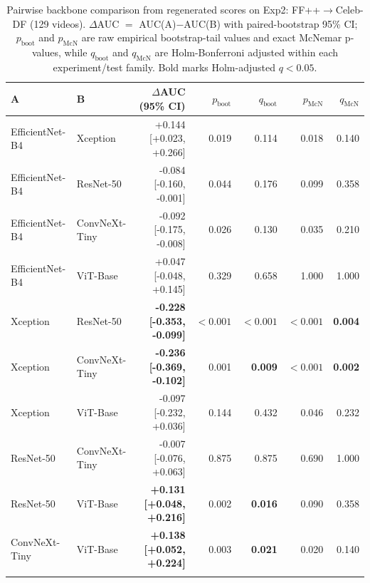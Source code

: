 \begin{table}[!htbp]
\caption{Pairwise backbone comparison from regenerated scores on Exp2: FF++$\to$Celeb-DF (129 videos). $\Delta$AUC $=$ AUC(A)$-$AUC(B) with paired-bootstrap 95\% CI; $p_{\mathrm{boot}}$ and $p_{\mathrm{McN}}$ are raw empirical bootstrap-tail values and exact McNemar p-values, while $q_{\mathrm{boot}}$ and $q_{\mathrm{McN}}$ are Holm-Bonferroni adjusted within each experiment/test family. Bold marks Holm-adjusted $q<0.05$.}
\centering
\small
\setlength{\tabcolsep}{3pt}
\begin{tabular}{l l r r r r r}
\toprule
\textbf{A} & \textbf{B} & \textbf{$\Delta$AUC (95\% CI)} & \textbf{$p_{\mathrm{boot}}$} & \textbf{$q_{\mathrm{boot}}$} & \textbf{$p_{\mathrm{McN}}$} & \textbf{$q_{\mathrm{McN}}$} \\
\midrule
EfficientNet-B4 & Xception & +0.144 [+0.023, +0.266] & 0.019 & 0.114 & 0.018 & 0.140 \\
EfficientNet-B4 & ResNet-50 & -0.084 [-0.160, -0.001] & 0.044 & 0.176 & 0.099 & 0.358 \\
EfficientNet-B4 & ConvNeXt-Tiny & -0.092 [-0.175, -0.008] & 0.026 & 0.130 & 0.035 & 0.210 \\
EfficientNet-B4 & ViT-Base & +0.047 [-0.048, +0.145] & 0.329 & 0.658 & 1.000 & 1.000 \\
Xception & ResNet-50 & \textbf{-0.228 [-0.353, -0.099]} & $<0.001$ & \textbf{$<0.001$} & $<0.001$ & \textbf{0.004} \\
Xception & ConvNeXt-Tiny & \textbf{-0.236 [-0.369, -0.102]} & 0.001 & \textbf{0.009} & $<0.001$ & \textbf{0.002} \\
Xception & ViT-Base & -0.097 [-0.232, +0.036] & 0.144 & 0.432 & 0.046 & 0.232 \\
ResNet-50 & ConvNeXt-Tiny & -0.007 [-0.076, +0.063] & 0.875 & 0.875 & 0.690 & 1.000 \\
ResNet-50 & ViT-Base & \textbf{+0.131 [+0.048, +0.216]} & 0.002 & \textbf{0.016} & 0.090 & 0.358 \\
ConvNeXt-Tiny & ViT-Base & \textbf{+0.138 [+0.052, +0.224]} & 0.003 & \textbf{0.021} & 0.020 & 0.140 \\
\botrule
\end{tabular}
\label{tab:sig_exp2}
\end{table}

